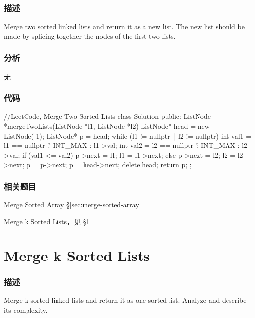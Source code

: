 \subsubsection{描述}
Merge two sorted linked lists and return it as a new list. The new list should be made by splicing together the nodes of the first two lists.


\subsubsection{分析}
无


\subsubsection{代码}
\begin{Code}
//LeetCode, Merge Two Sorted Lists
class Solution {
public:
    ListNode *mergeTwoLists(ListNode *l1, ListNode *l2) {
        ListNode* head = new ListNode(-1);
        ListNode* p = head;
        while (l1 != nullptr || l2 != nullptr) {
            int val1 = l1 == nullptr ? INT_MAX : l1->val;
            int val2 = l2 == nullptr ? INT_MAX : l2->val;
            if (val1 <= val2) {
                p->next = l1;
                l1 = l1->next;
            } else {
                p->next = l2;
                l2 = l2->next;
            }
            p = p->next;
        }
        p = head->next;
        delete head;
        return p;
    }
};
\end{Code}


\subsubsection{相关题目}
\begindot
\item Merge Sorted Array \S \ref{sec:merge-sorted-array}
\item Merge k Sorted Lists，见 \S \ref{sec:merge-k-sorted-lists}
\myenddot


\section{Merge k Sorted Lists} %
\label{sec:merge-k-sorted-lists}


\subsubsection{描述}
Merge k sorted linked lists and return it as one sorted list. Analyze and describe its complexity.


